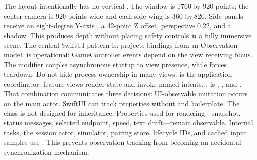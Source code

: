 {}The layout intentionally has no vertical . The window is 1760 by 920 points; the center camera is 920 points wide and each side wing is 360 by 820. Side panels receive an eight-degree Y-axis , a 42-point Z offset, perspective 0.22, and a shadow. This produces depth without placing safety controls in a fully immersive scene.\markdownRendererParagraphSeparator
{}The central SwiftUI pattern is:\markdownRendererInterblockSeparator
{}\markdownRendererInterblockSeparator
{} projects bindings from an Observation model.  is operational: GameController events depend on the view receiving focus. The  modifier couples asynchronous startup to view presence, while  forces teardown.\markdownRendererParagraphSeparator
{}Do not hide process ownership in many views.  is the application coordinator; feature views render state and invoke named intents.\markdownRendererInterblockSeparator
{}
\markdownRendererSectionEnd \markdownRendererSectionBegin
{}\markdownRendererInterblockSeparator
{}\markdownRendererBlockQuoteBegin
{} .\markdownRendererBlockQuoteEnd \markdownRendererInterblockSeparator
{} is , , and . That combination communicates three decisions:\markdownRendererInterblockSeparator
{}\markdownRendererOlBegin
{}UI-observable mutation occurs on the main actor.\markdownRendererOlItemEnd 
{}SwiftUI can track properties without  and  boilerplate.\markdownRendererOlItemEnd 
{}The class is not designed for inheritance.\markdownRendererOlItemEnd 
\markdownRendererOlEnd \markdownRendererInterblockSeparator
{}Properties used for rendering—snapshot, status messages, selected endpoint, speed, text draft—remain observable. Internal tasks, the session actor, simulator, pairing store, lifecycle IDs, and cached input samples use . This prevents observation tracking from becoming an accidental synchronization mechanism.\markdownRendererParagraphSeparator
